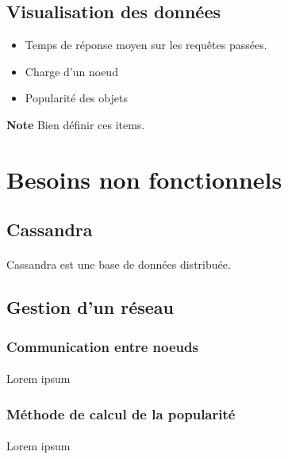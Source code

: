 \documentclass[12pt]{article}
\begin{document}
\subsection{Visualisation des données}

\begin{itemize}
 \item Temps de réponse moyen sur les requêtes passées.
 \item Charge d'un noeud
 \item Popularité des objets
\end{itemize}


\textbf{Note } Bien définir ces items. \newline


\newpage

\section{Besoins non fonctionnels}

\subsection{Cassandra}

\paragraph{} Cassandra est une base de données distribuée. 


\subsection{Gestion d'un réseau}

\subsubsection{Communication entre noeuds}
\paragraph{} Lorem ipsum

\subsubsection{Méthode de calcul de la popularité}
\paragraph{} Lorem ipsum
\end{document}
